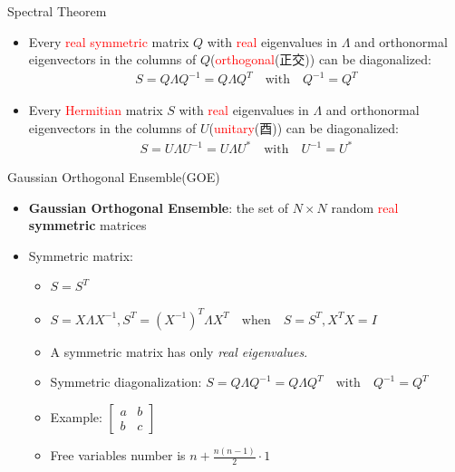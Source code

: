 \documentclass[UTF8,AutoFakeBold,AutoFakeSlant]{beamer}
\begin{document}
\begin{frame}{Spectral Theorem}
    \begin{itemize}
        \item Every \textcolor{red}{real symmetric} matrix $Q$ with \textcolor{red}{real} eigenvalues in $\Lambda$ and orthonormal eigenvectors in the columns of $Q$(\textcolor{red}{orthogonal}(正交)) can be diagonalized:
              \begin{align*}
                  S=Q\Lambda Q^{-1} = Q\Lambda Q^T \quad\text{with}\quad Q^{-1} = Q^T
              \end{align*}
        \item Every \textcolor{red}{Hermitian} matrix $S$ with \textcolor{red}{real} eigenvalues in $\Lambda$ and orthonormal eigenvectors in the columns of $U$(\textcolor{red}{unitary}(酉)) can be diagonalized:
              \begin{align*}
                  S=U\Lambda U^{-1} = U\Lambda U^* \quad\text{with}\quad U^{-1} = U^*
              \end{align*}
    \end{itemize}
\end{frame}

\begin{frame}{Gaussian Orthogonal Ensemble(GOE)}
    \begin{itemize}
        \item \textbf{Gaussian Orthogonal Ensemble}: the set of $N \times N$ random \textcolor{red}{real} \textbf{symmetric} matrices
        \item Symmetric matrix:
              \begin{itemize}
                  \item $S=S^T$
                  \item $S=X\Lambda X^{-1}, S^T=(X^{-1})^T\Lambda X^T\quad \text{when}\quad S=S^T, X^TX=I$
                  \item A symmetric matrix has only \emph{real eigenvalues}.
                  \item Symmetric diagonalization: $S=Q\Lambda Q^{-1} = Q\Lambda Q^T \quad\text{with}\quad Q^{-1} = Q^T$
                  \item Example: $\begin{bmatrix}
                                a & b \\
                                b & c
                            \end{bmatrix}$
                  \item Free variables number is $n+\frac{n(n-1)}{2}\cdot 1$
              \end{itemize}
    \end{itemize}
\end{frame}
\end{document}
